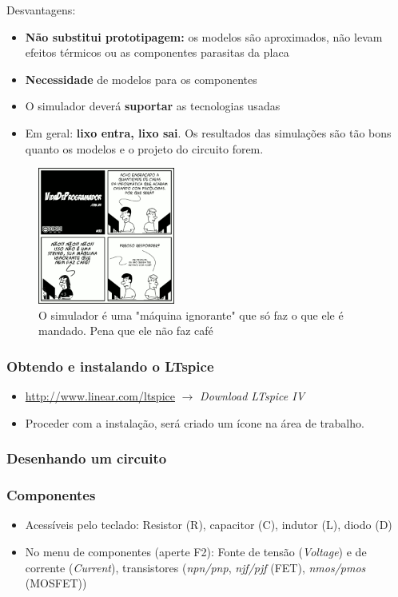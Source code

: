 \documentclass{beamer}
\begin{document}
\begin{frame}
Desvantagens:
\begin{itemize}
\item{\textbf{Não substitui prototipagem:} os modelos são aproximados, não levam efeitos térmicos ou as componentes parasitas da placa}
\item{\textbf{Necessidade} de modelos para os componentes}
\item{O simulador deverá \textbf{suportar} as tecnologias usadas}


\item{Em geral: \textbf{lixo entra, lixo sai}. Os resultados das simulações são tão bons quanto os modelos e o projeto do circuito forem.}
\end{itemize}
\end{frame}

\begin{frame}

\begin{figure}[htb]
\includegraphics[width=170px]{images/tirinha33}
\caption{O simulador é uma "máquina ignorante" que só faz o que ele é mandado. Pena que ele não faz café}
\label{fig:lixoentrasai}
\end{figure}

\end{frame}

\begin{frame}
\frametitle{Obtendo e instalando o LTspice}
\begin{itemize}
\item \url{http://www.linear.com/ltspice} $\rightarrow$ \textit{Download LTspice IV}
\item Proceder com a instalação, será criado um ícone na área de trabalho.
\end{itemize}
\end{frame}

\begin{frame}
\frametitle{Desenhando um circuito}
\end{frame}

\begin{frame}
\frametitle{Componentes}
\begin{itemize}
\item {Acessíveis pelo teclado:} Resistor (R), capacitor (C), indutor (L), diodo (D)
\item {No menu de componentes (aperte F2)}: Fonte de tensão (\textit{Voltage}) e de corrente (\textit{Current}), transistores (\textit{npn/pnp}, \textit{njf/pjf} (FET), \textit{nmos/pmos} (MOSFET))
\end{itemize}
\end{frame}
\end{document}
